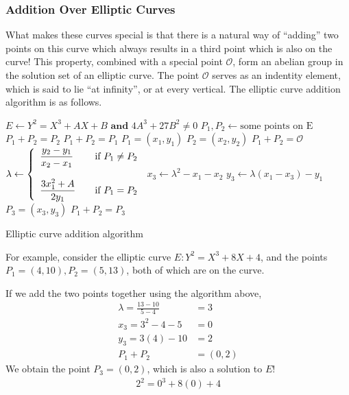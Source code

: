 \documentclass[12pt, a4paper, final]{report}
\begin{document}
\clearpage
\subsubsection{Addition Over Elliptic Curves}

What makes these curves special is that there is a natural way of ``adding''
two points on this curve which always results in a third point which is also on
the curve! This property, combined with a special point $\mathcal{O}$, form an abelian
group in the solution set of an elliptic curve. The point $\mathcal{O}$ serves
as an indentity element, which is said to lie ``at infinity'', or at every
vertical. The elliptic curve addition algorithm is as follows.

\begin{algorithm}
\begin{algorithmic}[]
    \Ensure $E \leftarrow Y^2 = X^3 + AX + B \textbf{ and } 4A^3 + 27B^2 \neq 0$
    \Require $P_1, P_2 \leftarrow \text{some points on E}$
            \Return $P_1 + P_2 = P_2$
        \Else
            \Return $P_1 + P_2 = P_1$
        \EndIf
    \Else
        \State $P_1 = (x_1, y_1)$
        \State $P_2 = (x_2, y_2)$
            \Return $P_1 + P_2 = \mathcal{O}$
        \Else
            \State $\lambda \leftarrow \left\{
                \begin{array}{l l}
                    \dfrac{y_2 - y_1}{x_2 - x_1} & \quad \text{if $P_1 \neq P_2$}\\\\
                    \dfrac{3x_1^2 + A}{2y_1} & \quad \text{if $P_1 = P_2$}\\
                \end{array}
                \right.$
            \State $x_3 \leftarrow \lambda^2 - x_1 - x_2$
            \State $y_3 \leftarrow \lambda(x_1 - x_3) - y_1$
            \State $P_3 = (x_3, y_3)$
            \Return $P_1 + P_2 = P_3$
        \EndIf
    \EndIf
\end{algorithmic}
\caption{Elliptic curve addition algorithm}
\end{algorithm}

For example, consider the elliptic curve $E: Y^2 = X^3 + 8X + 4$, and the
points $P_1 = (4, 10), P_2 = (5, 13)$, both of which are on the curve.

If we add the two points together using the algorithm above,
\begin{align*}
    \lambda = \frac{13 - 10}{5 - 4} &= 3\\
    x_3 = 3^2 - 4 - 5 &= 0\\
    y_3 = 3(4) - 10 &= 2\\
    P_1 + P_2 &= (0, 2)
\end{align*}
We obtain the point $P_3 = (0, 2)$, which is also a solution to $E$!
\begin{align*}
    2^2 = 0^3 + 8(0) + 4
\end{align*}
\end{document}
